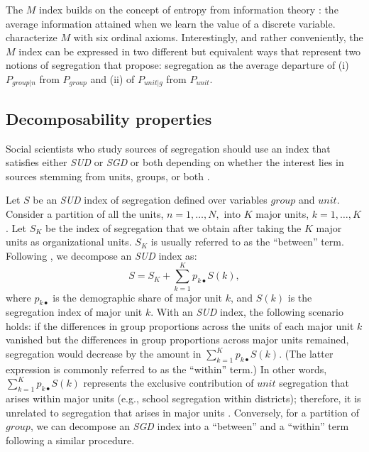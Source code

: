 The $M$ index builds on the concept of entropy from information theory \citep{kullback_1959}: the average information attained when we learn the value of a discrete variable.
\citet{frankel_volij_2011} characterize $M$ with six ordinal axioms.
Interestingly, and rather conveniently, the $M$ index can be expressed in two different but equivalent ways that represent two notions of segregation that \citet{massey_denton_1988} propose: segregation as the average departure of (i) $P_{group | n}$ from $P_{group}$ and (ii) of $P_{unit | g}$ from $P_{unit}$.

\subsection{Decomposability properties}
Social scientists who study sources of segregation should use an index that satisfies either \textit{SUD} or \textit{SGD} or both depending on whether the interest lies in sources stemming from units, groups, or both \citep{mora_ruiz-castillo_2003, frankel_volij_2011, mora2011entropy}.

Let $S$ be an \textit{SUD} index of segregation defined over variables $group$ and $unit$. Consider a partition of all the units, $n=1,\ldots,N,$ into $K$ major units, $k=1,\ldots,K$. Let $S_{K}$ be the index of segregation that we obtain after taking the $K$ major units as organizational units. $S_K$ is usually referred to as the ``between'' term. Following \citet{frankel_volij_2011}, we decompose an \textit{SUD} index as:
\begin{equation}
    S = S_{K} + \sum_{k=1}^{K} p_{k \bullet} S(k),
    \label{eq: SUD-property}
\end{equation}
\noindent where $p_{k \bullet}$ is the demographic share of major unit $k$, and $S(k)$ is the segregation index of major unit $k$. With an \textit{SUD} index, the following scenario holds: if the differences in group proportions across the units of each major unit $k$ vanished but the differences in group proportions across major units remained, segregation would decrease by the amount in $\sum_{k=1}^{K} p_{k \bullet} S(k)$. (The latter expression is commonly referred to as the ``within'' term.)
In other words, $\sum_{k=1}^{K} p_{k \bullet} S(k)$ represents the exclusive contribution of $unit$ segregation that arises within major units (e.g., school segregation within districts); therefore, it is unrelated to segregation that arises in major units \citep{mora2011entropy}. Conversely, for a partition of $group$, we can decompose an \textit{SGD} index into a ``between'' and a ``within'' term following a similar procedure.

